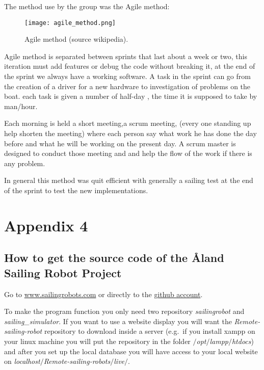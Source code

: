 \documentclass[twoside,12pt]{report} %
\begin{document}
The method use by the group was the Agile method:
\begin{figure}[H]
\centering
    \texttt{[image: agile\_method.png]}
    \caption*{Agile method (source wikipedia).}
\end{figure}

Agile method is separated  between sprints that last about a week or two, this iteration must add features or debug the code without breaking it, at the end of the sprint we always have a working software. A task in the sprint can go from the creation of a driver for a new hardware to investigation of problems on the boat. each task is given a number of half-day , the time it is supposed to take by man/hour.

Each morning is held a short meeting,a scrum meeting, (every one standing up help shorten the meeting) where each person say what work he has done the day before and what he will be working on the present day. A scrum master is designed to conduct those meeting and and help the flow of the work if there is any problem.

In general this method was quit efficient with generally a sailing test at the end of the sprint to test the new implementations.




\chapter*{Appendix 4}

\section*{How to get the source code of the \r{A}land Sailing Robot Project}


Go to \href{www.sailingrobots.com}{www.sailingrobots.com} or directly to the  \href{https://github.com/AlandSailingRobots}{github account}. 

To make the program function you only need two repository \textit{sailingrobot} and \textit{sailing\_simulator}. If you want to use a website display you will want the \textit{Remote-sailing-robot} repository to download inside a server (e.g.\ if you install xampp on your linux machine you will put the repository in the folder \textit{$\slash$opt$\slash$lampp$\slash$htdocs}) and after you set up the local database you will have access to your local website on \textit{localhost$\slash$Remote-sailing-robots$\slash$live$\slash$}.

%


\nocite{*}


\end{document}
